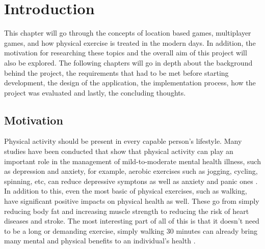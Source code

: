 \documentclass{dissertation}
\begin{document}
\def\consentname {Pedro Henrique de Castro e Melo Carvalho}
\def\consentdate{12 April 2021}

\educationalconsent


\tableofcontents


\chapter{Introduction}


This chapter will go through the concepts of location based games, multiplayer games, and how physical 
exercise is treated in the modern days. In addition, the motivation for researching these topics and the 
overall aim of this project will also be explored. The following chapters will go in depth about the background 
behind the project, the requirements that had to be met before starting development, the design of the application, 
the implementation process, how the project was evaluated and lastly, the concluding thoughts.

\section{Motivation}

Physical activity should be present in every capable person's lifestyle. Many studies have been conducted that show 
that physical activity can play an important role in the management of mild-to-moderate mental health illness, such as 
depression and anxiety, for example, aerobic exercises such as jogging, cycling, spinning, etc, can reduce depressive 
symptons as well as anxiety and panic ones \citep{Paluska12}. In addition to this, even the most basic of physical exercises, 
such as walking, have significant positive impacts on physical health as well. These go from simply reducing body fat and 
increasing muscle strength to reducing the risk of heart diseases and stroke. The most interesting part of all of this is 
that it doesn't need to be a long or demanding exercise, simply walking 30 minutes can already bring many mental and 
physical benefits to an individual's health \citep{Harvard10}.
\end{document}
